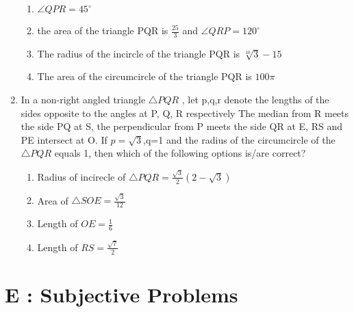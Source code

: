 \documentclass[12pt]{article}
\begin{document}
\begin{enumerate}
\begin{enumerate}
\item $\angle QPR=45^\circ$
\item the area of the triangle PQR is $\frac{25}{3}$ and $\angle QRP=120^\circ$
\item The radius of the incircle of the triangle PQR is $\sqrt[10]{3}-15$
\item The area of the circumcircle of the triangle PQR is $100\pi$
\end{enumerate}
\item In a non-right angled triangle $\triangle PQR$ , let p,q,r denote the lengths of the sides opposite to the angles at P, Q, R respectively The median from R meets the side PQ at S, the perpendicular from P meets the side QR at E, RS and PE intersect at O. If $p=\sqrt{3}$,q=1 and the radius of the circumcircle of the $\triangle PQR$ equals 1, then which of the following options is/are correct? 
\begin{enumerate}
\item Radius of incirecle of $\triangle PQR=\frac{\sqrt{3}}{2}(2-\sqrt{3})$
\item Area of $\triangle SOE=\frac{\sqrt{3}}{12}$
\item Length of $OE=\frac{1}{6}$
\item Length of $RS=\frac{\sqrt{7}}{2}$
\end{enumerate}
\end{enumerate}

\section*{E  :  Subjective Problems}
\end{document}
